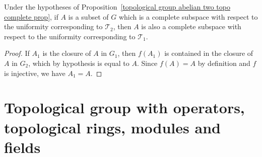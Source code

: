 \begin{corollary}
Under the hypotheses of Proposition~\ref{topological group abelian two topo complete prop}, if $A$ is a subset of $G$ which is a complete subspace with respect to the uniformity corresponding to $\mathcal{T}_2$, then $A$ is also a complete subspace with respect to the uniformity corresponding to $\mathcal{T}_1$.
\end{corollary}
\begin{proof}
If $A_1$ is the closure of $A$ in $G_1$, then $f(A_1)$ is contained in the closure of $A$ in $G_2$, which by hypothesis is equal to $A$. Since $f(A)=A$ by definition and $f$ is injective, we have $A_1=A$.
\end{proof}
\section{Topological group with operators, topological rings, modules and fields}
